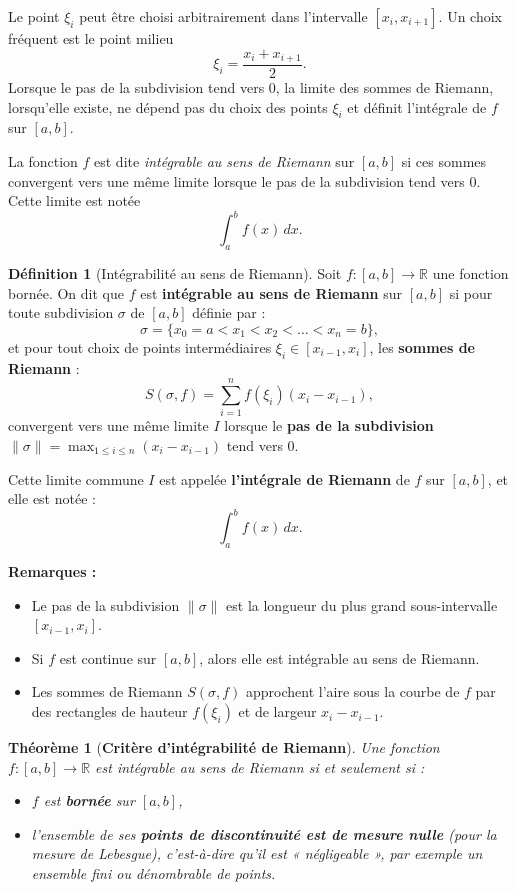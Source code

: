 \documentclass{report} %
\theoremstyle{definition}  %
\newtheorem{definition}{Définition}[chapter] %
\theoremstyle{plain} %
\newtheorem{theorem}{Théorème}[chapter]
\theoremstyle{remark} %
\begin{document}
\medskip
\noindent
Le point \(\xi_i\) peut être choisi arbitrairement dans l’intervalle
\([x_i,x_{i+1}]\).
Un choix fréquent est le point milieu
\[
\xi_i = \frac{x_i + x_{i+1}}{2}.
\]
Lorsque le pas de la subdivision tend vers 0, la limite des sommes de Riemann,
lorsqu’elle existe, ne dépend pas du choix des points \(\xi_i\) et définit
l’intégrale de \(f\) sur \([a,b]\).


\medskip
\noindent
La fonction \(f\) est dite \emph{intégrable au sens de Riemann} sur \([a,b]\)
si ces sommes convergent vers une même limite lorsque le pas de la subdivision
tend vers 0. Cette limite est notée
\[
\int_a^b f(x)\,dx.
\]

\medskip


\begin{definition}[Intégrabilité au sens de Riemann]
Soit \( f : [a, b] \to \mathbb{R} \) une fonction bornée. On dit que \( f \) est \textbf{intégrable au sens de Riemann} sur \([a, b]\) si pour toute subdivision \(\sigma\) de \([a, b]\) définie par :
\[
\sigma = \{x_0 = a < x_1 < x_2 < \dots < x_n = b\},
\]
et pour tout choix de points intermédiaires \(\xi_i \in [x_{i-1}, x_i]\), les \textbf{sommes de Riemann} :
\[
S(\sigma, f) = \sum_{i=1}^n f(\xi_i)(x_i - x_{i-1}),
\]
convergent vers une même limite \(I\) lorsque le \textbf{pas de la subdivision} \(\|\sigma\| = \max_{1 \leq i \leq n} (x_i - x_{i-1})\) tend vers 0.

\medskip
\noindent
Cette limite commune \(I\) est appelée \textbf{l'intégrale de Riemann} de \(f\) sur \([a, b]\), et elle est notée :
\[
\int_a^b f(x) \, dx.
\]
\end{definition}

\medskip

\textbf{Remarques :}
\begin{itemize}
    \item Le pas de la subdivision \(\|\sigma\|\) est la longueur du plus grand sous-intervalle \([x_{i-1}, x_i]\).
    \item Si \(f\) est continue sur \([a, b]\), alors elle est intégrable au sens de Riemann.
    \item Les sommes de Riemann \(S(\sigma, f)\) approchent l'aire sous la courbe de \(f\) par des rectangles de hauteur \(f(\xi_i)\) et de largeur \(x_i - x_{i-1}\).
\end{itemize}

\medskip

\begin{theorem}[\textbf{Critère d’intégrabilité de Riemann}]
Une fonction \(f : [a,b] \to \mathbb{R}\) est intégrable au sens de Riemann
si et seulement si :
\begin{itemize}
    \item \(f\) est \textbf{bornée} sur \([a,b]\),
    \item l’ensemble de ses \textbf{points de discontinuité est de mesure nulle}
    (pour la mesure de Lebesgue), c’est-à-dire qu’il est « négligeable »,
    par exemple un ensemble fini ou dénombrable de points.
\end{itemize}
\end{theorem}
\end{document}
